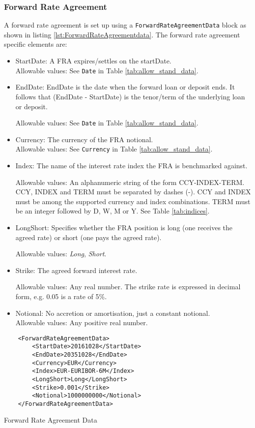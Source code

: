 \subsubsection{Forward Rate Agreement}

A forward rate agreement is set up using a {\tt ForwardRateAgreementData} block as shown in listing \ref{lst:ForwardRateAgreementdata}. The forward rate agreement specific elements
are:

\begin{itemize}
\item StartDate: A FRA expires/settles on the startDate. \\

Allowable values:  See \lstinline!Date! in Table \ref{tab:allow_stand_data}.

\item EndDate: EndDate is the date when the forward loan or deposit ends. It follows that (EndDate - StartDate) is the tenor/term of the underlying loan or deposit.

Allowable values:  See \lstinline!Date! in Table \ref{tab:allow_stand_data}.
\item Currency: The currency of the FRA notional. \\

Allowable values:  See \lstinline!Currency! in Table \ref{tab:allow_stand_data}.	
\item Index: The name of the interest rate index the FRA is benchmarked against.

  Allowable values: An alphanumeric string of the form CCY-INDEX-TERM. CCY, INDEX and TERM must be separated by dashes (-). CCY and INDEX must be among the supported currency and index combinations. TERM must be an integer followed by D, W,
  M or Y. See Table \ref{tab:indices}.
  
\item LongShort: Specifies whether the FRA position is long (one receives the agreed rate) or short (one pays the agreed rate).

Allowable values: \emph{Long}, \emph{Short}.
\item Strike: The agreed forward interest rate.

Allowable values: Any  real number. The strike rate is
  expressed in decimal form, e.g. 0.05 is a rate of 5\%.
\item Notional: No accretion or amortisation, just a constant notional. \\
Allowable values:  Any positive real number.
\end{itemize}


\begin{listing}[H]
\begin{verbatim}
    <ForwardRateAgreementData>
        <StartDate>20161028</StartDate>
        <EndDate>20351028</EndDate>
        <Currency>EUR</Currency>
        <Index>EUR-EURIBOR-6M</Index>
        <LongShort>Long</LongShort>
        <Strike>0.001</Strike>
        <Notional>1000000000</Notional>
    </ForwardRateAgreementData>
\end{verbatim}
\caption{Forward Rate Agreement Data}
\label{lst:ForwardRateAgreementdata}
\end{listing}